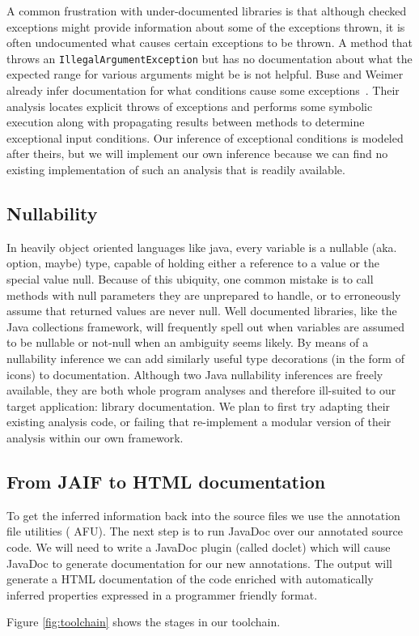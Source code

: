 A common frustration with under-documented libraries is that although checked
exceptions might provide information about some of the exceptions thrown, it is
often undocumented what causes certain exceptions to be thrown.  A method that
throws an \texttt{IllegalArgumentException} but has no documentation about what
the expected range for various arguments might be is not helpful.  Buse and
Weimer already infer documentation for what conditions cause some
exceptions~\cite{autodoc}.  Their analysis locates explicit throws of exceptions
and performs some symbolic execution along with propagating results between
methods to determine exceptional input conditions.  Our inference of exceptional
conditions is modeled after
theirs, but we will implement our own inference because we can find no existing
implementation of such an analysis that is readily available.

\subsection{Nullability}
\label{sec:Nullability}
In heavily object oriented languages like java, every variable is a nullable 
(aka. option, maybe) type, capable of holding either a reference to a value or 
the special value null.  Because of this ubiquity, one common mistake is to 
call methods with null parameters they are unprepared to handle, or to 
erroneously assume that returned values are never null.  Well documented 
libraries, like the Java collections framework, will frequently spell out when 
variables are assumed to be nullable or not-null when an ambiguity seems likely.  
By means of a nullability inference\cite{NIT,NonNullTypeInference} we can add 
similarly useful type decorations (in the form of icons) to documentation.  
Although two Java nullability inferences are freely available, they are both 
whole program analyses and therefore ill-suited to our target application: 
library documentation.  We plan to first try adapting their existing analysis 
code, or failing that re-implement a modular version of their analysis within 
our own framework.

\subsection{From JAIF to HTML documentation}
\label{sec:jaif2html}

To get the inferred information back into the source files we use the annotation 
file utilities (\cite{AFU} AFU). The next step is to run JavaDoc over our
annotated source code. We will need to write a JavaDoc plugin (called doclet) which will
cause JavaDoc to generate documentation for our new annotations. The output will
generate a HTML documentation of the code enriched with automatically inferred
properties expressed in a programmer friendly format.

Figure \ref{fig:toolchain} shows the stages in our toolchain.
